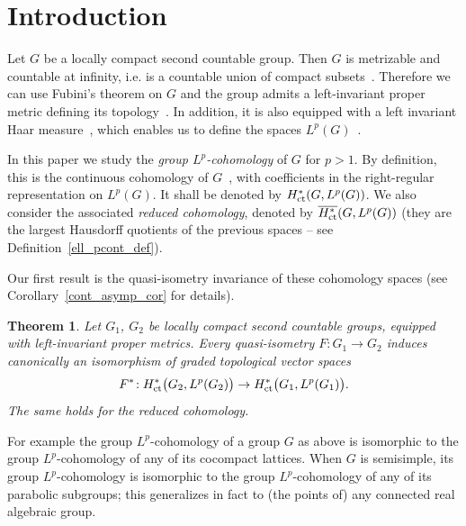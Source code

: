\documentclass[11pt]{article}
\newtheorem{theo}{Theorem}[section]
\theoremstyle{definition}
\numberwithin{equation}{section}
\numberwithin{figure}{section}
\numberwithin{table}{section}
\DeclareMathOperator{\ct}{ct}
\begin{document}
\section{Introduction}\label{1}

Let $G$ be a locally compact second countable group. Then $G$ is metrizable and countable at infinity, i.e. is a countable union of compact subsets~\cite[Chapter~IX, \textsection~2.9, Corollary to Proposition~16, p.~21]{BBK-TG-5to10}. Therefore we can use Fubini's theorem on $G$ and the group admits a left-invariant proper metric defining its topology~\cite[Struble~Theorem~2.B.4]{CdH}. In addition, it is also equipped with a left invariant Haar measure~\cite[Chapter~VII, \textsection~1.2, Theorem~1]{BBK-INT-7}, which enables us to define the spaces $L^p(G)$~\cite[Chapter~IV, \textsection~3.4, Definition~2]{BBK-INT-1to4}.

In this paper we study the \emph{group $L^p$-cohomology} of $G$ for $p>1$. By definition, this is the continuous cohomology of $G$~\cite[Chapter~IX]{BW}, with coefficients in the right-regular representation on $L^p(G)$. It shall be denoted by ${\rm H}^*_{\ct} (G, L^p(G))$. We also consider the associated \emph{reduced cohomology}, denoted by $\overline{{\rm H}^*_{\ct}} (G, L^p(G))$ (they are the largest Hausdorff quotients of the previous spaces -- see Definition~\ref{ell_pcont_def}).

Our first result is the quasi-isometry invariance of these cohomology spaces (see Corollary~\ref{cont_asymp_cor} for details).


\begin{theo}\label{intro-thm1}
Let $G_1$, $G_2$ be locally compact second countable groups, equip\-ped with left-invariant proper metrics. Every quasi-isometry $F: G_1 \to G_2$ induces canonically an isomorphism of graded topological vector spaces
\[
F ^*\!: {\rm H}^*_{\ct} \bigl(G_2, L^p(G_2) \bigr) \to {\rm H}^*_{\ct} \bigl(G_1, L^p(G_1) \bigr).
\]
The same holds for the reduced cohomology.
\end{theo}

For example the group $L^p$-cohomology of a group $G$ as above is isomorphic to the group $L^p$-cohomology of any of its cocompact lattices. When $G$ is semisimple, its group $L^p$-cohomology is isomorphic to the group $L^p$-cohomology of any of its parabolic subgroups; this generalizes in fact to (the points of) any connected real algebraic group.
\end{document}
